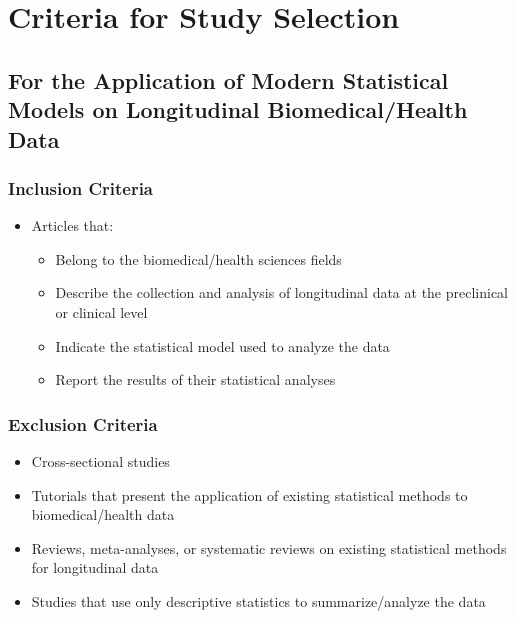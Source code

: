 \documentclass[
]{article}
\begin{document}
\hypertarget{criteria-for-study-selection}{%
\section{Criteria for Study
Selection}\label{criteria-for-study-selection}}

\hypertarget{for-the-application-of-modern-statistical-models-on-longitudinal-biomedicalhealth-data}{%
\subsection{For the Application of Modern Statistical Models on
Longitudinal Biomedical/Health
Data}\label{for-the-application-of-modern-statistical-models-on-longitudinal-biomedicalhealth-data}}

\hypertarget{inclusion-criteria}{%
\subsubsection{Inclusion Criteria}\label{inclusion-criteria}}

\begin{itemize}
\item
  Articles that:

  \begin{itemize}
  \item
    Belong to the biomedical/health sciences fields
  \item
    Describe the collection and analysis of longitudinal data at the
    preclinical or clinical level
  \item
    Indicate the statistical model used to analyze the data
  \item
    Report the results of their statistical analyses
  \end{itemize}
\end{itemize}

\hypertarget{exclusion-criteria}{%
\subsubsection{Exclusion Criteria}\label{exclusion-criteria}}

\begin{itemize}
\item
  Cross-sectional studies
\item
  Tutorials that present the application of existing statistical methods
  to biomedical/health data
\item
  Reviews, meta-analyses, or systematic reviews on existing statistical
  methods for longitudinal data
\item
  Studies that use only descriptive statistics to summarize/analyze the
  data
\end{itemize}
\end{document}
